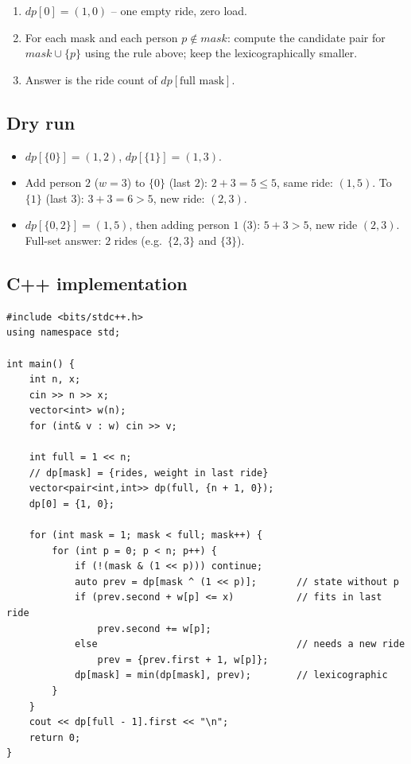 \begin{enumerate}
  \item $\textit{dp}[0]=(1,0)$ -- one empty ride, zero load.
  \item For each mask and each person $p\notin\textit{mask}$: compute
        the candidate pair for $\textit{mask}\cup\{p\}$ using the rule
        above; keep the lexicographically smaller.
  \item Answer is the ride count of $\textit{dp}[\text{full mask}]$.
\end{enumerate}

\subsection*{Dry run}


\begin{itemize}
  \item $\textit{dp}[\{0\}]=(1,2)$, $\textit{dp}[\{1\}]=(1,3)$.
  \item Add person $2$ ($w=3$) to $\{0\}$ (last $2$): $2+3=5\le5$, same
        ride: $(1,5)$. To $\{1\}$ (last $3$): $3+3=6>5$, new ride:
        $(2,3)$.
  \item $\textit{dp}[\{0,2\}]=(1,5)$, then adding person $1$
        ($3$): $5+3>5$, new ride $(2,3)$. Full-set answer: $2$ rides
        (e.g.\ $\{2,3\}$ and $\{3\}$).
\end{itemize}

\subsection*{C++ implementation}

\begin{lstlisting}
#include <bits/stdc++.h>
using namespace std;

int main() {
    int n, x;
    cin >> n >> x;
    vector<int> w(n);
    for (int& v : w) cin >> v;

    int full = 1 << n;
    // dp[mask] = {rides, weight in last ride}
    vector<pair<int,int>> dp(full, {n + 1, 0});
    dp[0] = {1, 0};

    for (int mask = 1; mask < full; mask++) {
        for (int p = 0; p < n; p++) {
            if (!(mask & (1 << p))) continue;
            auto prev = dp[mask ^ (1 << p)];       // state without p
            if (prev.second + w[p] <= x)           // fits in last ride
                prev.second += w[p];
            else                                   // needs a new ride
                prev = {prev.first + 1, w[p]};
            dp[mask] = min(dp[mask], prev);        // lexicographic
        }
    }
    cout << dp[full - 1].first << "\n";
    return 0;
}
\end{lstlisting}

